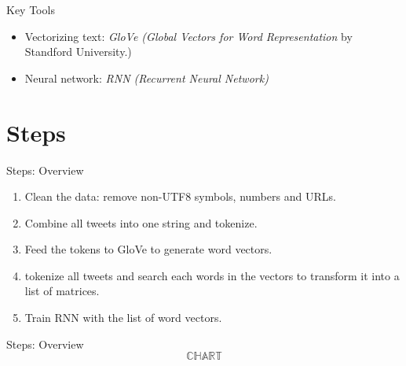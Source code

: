 \documentclass{beamer}
\begin{document}
\begin{frame}{Key Tools}
	\begin{itemize}
		\item Vectorizing text: \textit{GloVe (Global Vectors for Word Representation} by Standford University.)
		\item Neural network: \textit{RNN (Recurrent Neural Network)}
	\end{itemize}
\end{frame}

\section{Steps}%
\label{sec:steps}


\begin{frame}{Steps: Overview}
	\begin{enumerate}
		\item Clean the data: remove non-UTF8 symbols, numbers and URLs.
		\item Combine all tweets into one string and tokenize.
		\item Feed the tokens to GloVe to generate word vectors.
		\item tokenize all tweets and search each words in the vectors to transform it into a list of matrices.
		\item Train RNN with the list of word vectors.
	\end{enumerate}	
\end{frame}

\begin{frame}{Steps: Overview}
	\begin{equation}
		\mathbb{CHART}
	\end{equation}
\end{frame}
\end{document}
